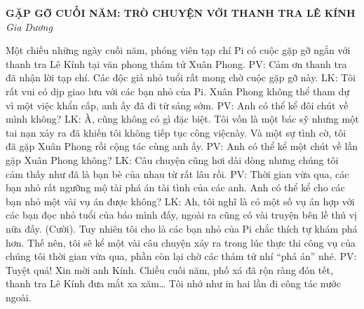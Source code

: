 \newpage
\graphicspath{{../suyluancungbi/xuanphong/}}
	\begin{center}
			\textbf{\Large\color{toancuabi} GẶP GỠ CUỐI NĂM: TRÒ CHUYỆN VỚI THANH TRA LÊ KÍNH}\\
			\textit{Gia Dương}
		\end{center}
%	
%	
%	
	Một chiều những ngày cuối năm, phóng viên tạp chí Pi có cuộc gặp gỡ ngắn với thanh tra Lê Kính tại văn phong thám tử Xuân Phong.
	\vskip 0.1cm
	PV: Cảm ơn thanh tra đã nhận lời tạp chí. Các độc giả nhỏ tuổi rất mong chờ cuộc gặp gỡ này.
	\vskip 0.1cm
	LK: Tôi rất vui có dịp giao lưu với các bạn nhỏ của Pi. Xuân Phong không thể tham dự vì một việc khẩn cấp, anh ấy đã đi từ sáng sớm.
	\vskip 0.1cm
	PV: Anh có thể kể đôi chút về mình không?
	\vskip 0.1cm
	LK: À, cũng không có gì đặc biệt. Tôi vốn là một bác sỹ nhưng một tai nạn xảy ra đã khiến tôi không tiếp tục công việcnày. Và một sự tình cờ, tôi đã gặp Xuân Phong rồi  cộng tác cùng anh ấy. 
	\vskip 0.1cm
	PV: Anh có thể kể một chút về lần gặp Xuân Phong không?
	\vskip 0.1cm
	LK: Câu chuyện cũng hơi dài dòng nhưng chúng tôi cảm thấy như đã là bạn bè của nhau từ rất lâu rồi.
	\vskip 0.1cm
	PV: Thời gian vừa qua,  các bạn nhỏ rất ngưỡng mộ tài phá án tài tình của các anh. Anh có thể kể cho các bạn nhỏ một vài vụ án được không?
	\vskip 0.1cm
	LK: Ah, tôi  nghĩ là có một số vụ án hợp với các bạn đọc nhỏ tuổi của báo mình đấy, ngoài ra cũng có  vài truyện bên lề  thú vị nữa đấy. (Cười). Tuy nhiên tôi cho là các bạn nhỏ của Pi chắc thích tự khám phá hơn. Thế nên, tôi sẽ kể một vài câu chuyện xảy ra trong lúc thực thi công vụ của chúng tôi thời gian vừa qua, phần còn lại chờ các thám tử nhí “phá án” nhé.
	\vskip 0.1cm
	PV: Tuyệt quá! Xin mời anh Kính.
	\vskip 0.1cm
	Chiều cuối năm, phố xá đã rộn ràng đón tết, thanh tra Lê Kính đưa mắt xa xăm…
	Tôi nhớ như in hai lần đi công tác nước ngoài.
	\vskip 0.1cm
	\newpage
	
